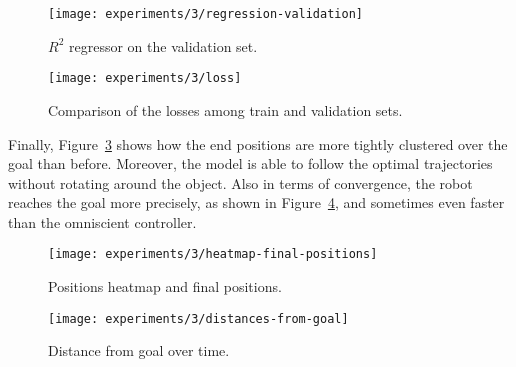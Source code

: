 \begin{figure}[htbp]
	\centerline{\texttt{[image: experiments/3/regression-validation]}}
	\caption{$R^2$ regressor on the validation set.}
	\label{fig:regression-3}
\end{figure}

\begin{figure}[htbp]
	\centerline{\texttt{[image: experiments/3/loss]}}
	\caption{Comparison of the losses among train and validation sets.}
	\label{fig:loss-3}
\end{figure}

Finally, Figure~\ref{fig:heatmap-final-positions} shows how the end positions 
are more tightly clustered over the goal than before. Moreover, the model is 
able to follow the optimal trajectories without rotating around the object.
Also in terms of convergence, the robot reaches the goal more precisely, as 
shown in Figure~\ref{fig:distance-from-goal-learned3}, and sometimes even 
faster than the omniscient controller.

\begin{figure}[htbp]
	\centerline{\texttt{[image: experiments/3/heatmap-final-positions]}}
	\caption{Positions heatmap and final positions.}
	\label{fig:heatmap-final-positions}
\end{figure}

\begin{figure}[htbp]
	\centerline{\texttt{[image: experiments/3/distances-from-goal]}}
	\caption{Distance from goal over time.}
	\label{fig:distance-from-goal-learned3}
\end{figure}